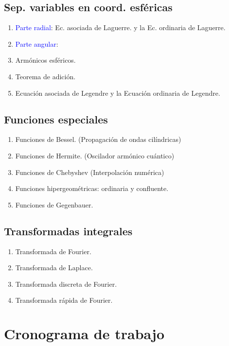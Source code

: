 \subsection{Sep. variables en coord. esféricas}

\begin{enumerate}
\item \textcolor{blue}{Parte radial}: Ec. asociada de Laguerre. y la Ec. ordinaria de Laguerre.
\item \textcolor{blue}{Parte angular}:
\item Armónicos esféricos.
\item Teorema de adición.
\item Ecuación asociada de Legendre y la Ecuación ordinaria de Legendre.
\end{enumerate}

\subsection{Funciones especiales}

\begin{enumerate}
\item Funciones de Bessel. (Propagación de ondas cilíndricas)
\item Funciones de Hermite. (Oscilador armónico cuántico)
\item Funciones de Chebyshev (Interpolación numérica)
\item Funciones hipergeométricas: ordinaria y confluente.
\item Funciones de Gegenbauer.
\end{enumerate}

\subsection{Transformadas integrales}

\begin{enumerate}
\item Transformada de Fourier.
\item Transformada de Laplace.
\item Transformada discreta de Fourier.
\item Transformada rápida de Fourier.
\end{enumerate}


\section{Cronograma de trabajo}

